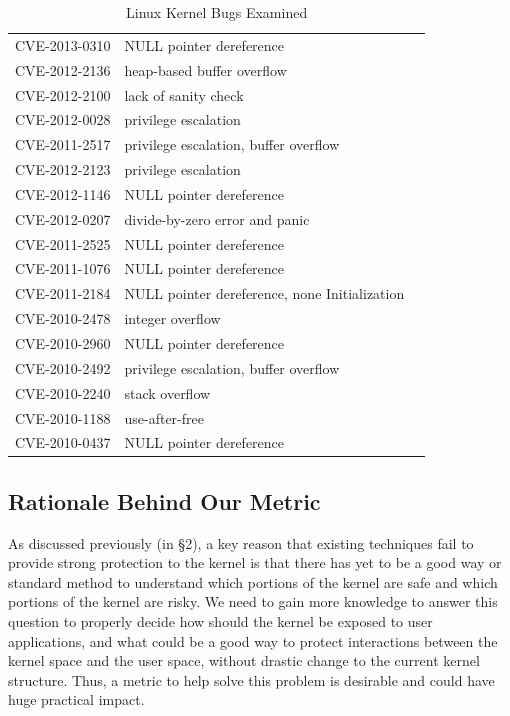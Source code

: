 \begin{table}[!ht]
\begin{tabular*}{\textwidth}{l @{\extracolsep{\fill}} lc}
 CVE-2013-0310 \cite{CVE:20130310} & NULL pointer dereference \\
 CVE-2012-2136 \cite{CVE:20122136} & heap-based buffer overflow \\
 CVE-2012-2100 \cite{CVE:20122100} & lack of sanity check \\
 CVE-2012-0028 \cite{CVE:20120028} & privilege escalation \\
 CVE-2011-2517 \cite{CVE:20112517} & privilege escalation, buffer overflow \\
 CVE-2012-2123 \cite{CVE:20122123} & privilege escalation \\
 CVE-2012-1146 \cite{CVE:20121146} & NULL pointer dereference \\
 CVE-2012-0207 \cite{CVE:20120207} & divide-by-zero error and panic \\
 CVE-2011-2525 \cite{CVE:20112525} & NULL pointer dereference \\
 CVE-2011-1076 \cite{CVE:20111076} & NULL pointer dereference \\
 CVE-2011-2184 \cite{CVE:20112184} & NULL pointer dereference, none Initialization \\
 CVE-2010-2478 \cite{CVE:20102478} & integer overflow \\
 CVE-2010-2960 \cite{CVE:20102960} & NULL pointer dereference  \\
 CVE-2010-2492 \cite{CVE:20102492} & privilege escalation, buffer overflow \\
 CVE-2010-2240 \cite{CVE:20102240} & stack overflow \\
 CVE-2010-1188 \cite{CVE:20101188} & use-after-free \\
 CVE-2010-0437 \cite{CVE:20100437} & NULL pointer dereference \\
\bottomrule
\end{tabular*}
\caption {Linux Kernel Bugs Examined}
\label{table:kernel_bugs}
\end{table}

\subsection{Rationale Behind Our Metric}
As discussed previously (in \S{2}), a key reason that existing techniques 
fail to provide strong protection to the kernel is that there has yet to be a good way 
or standard method to understand which portions of the kernel are safe 
and which portions of the kernel are risky. We need to gain more knowledge to answer 
this question to properly decide how should the kernel be exposed to user applications, 
and what could be a good way to protect interactions between the kernel space and 
the user space, without drastic change to the current kernel structure. 
Thus, a metric to help solve this problem is desirable and could have huge practical impact. 


